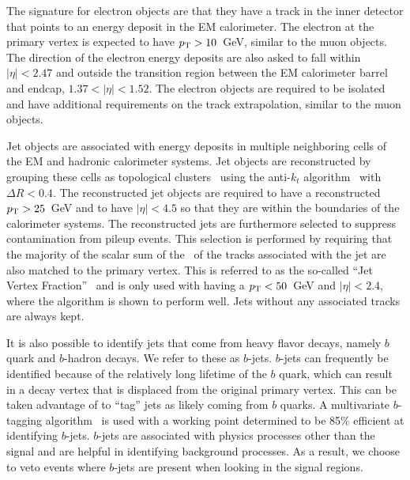 The signature for electron objects are that they have a track in the inner
detector that points to an energy deposit in the EM calorimeter.
The electron at the primary vertex is expected to have $p_{\mathrm{T}}>10$~GeV, similar
to the muon objects. The direction of the electron energy 
deposits are also asked to fall within $|\eta| < 2.47$ and outside the 
transition region between the EM calorimeter barrel and endcap, $1.37 < |\eta| < 1.52$.
The electron objects are required to be isolated and have additional
requirements on the track extrapolation, similar to the muon objects.  


Jet objects are associated with energy deposits in multiple 
neighboring cells of the EM and hadronic calorimeter systems.
Jet objects are reconstructed by grouping these cells
as topological clusters~\cite{Lampl:1099735}
using the anti-$k_t$ algorithm~\cite{Cacciari:2008gp} with $\Delta R < 0.4$.
The reconstructed jet objects are required to have a reconstructed
$p_{\mathrm{T}}>25$~GeV and to have $|\eta|<4.5$ so that
they are within the boundaries of the calorimeter systems.
The reconstructed jets are furthermore selected to suppress 
contamination from pileup events. This selection is performed by 
requiring that the majority of the
scalar sum of the \pt~of the tracks associated with the 
jet are also matched to the primary vertex. This is referred to
as the so-called 
``Jet Vertex Fraction''~\cite{Miller:1206864, ATLAS-CONF-2013-083}
and is only used with having a $p_{\mathrm{T}} < 50$~GeV and $|\eta|<2.4$, where
the algorithm is shown to perform well. Jets without any associated
tracks are always kept. 

It is also possible to identify jets that come from heavy flavor
decays, namely $b$ quark and $b$-hadron decays. We refer
to these as $b$-jets. $b$-jets can frequently be identified 
because of the relatively long lifetime of the $b$ quark, which can 
result in a decay vertex that is displaced from the original primary vertex.
This can be taken advantage of to ``tag'' jets as likely coming from
$b$ quarks. A multivariate $b$-tagging algorithm~\cite{ATLAS-CONF-2014-004}
is used with a working point determined to be 85\% efficient at
identifying $b$-jets. %
$b$-jets are associated with physics processes other than the signal
and are helpful in identifying background processes.
As a result, we choose to veto events where 
$b$-jets are present when looking in the signal regions.


